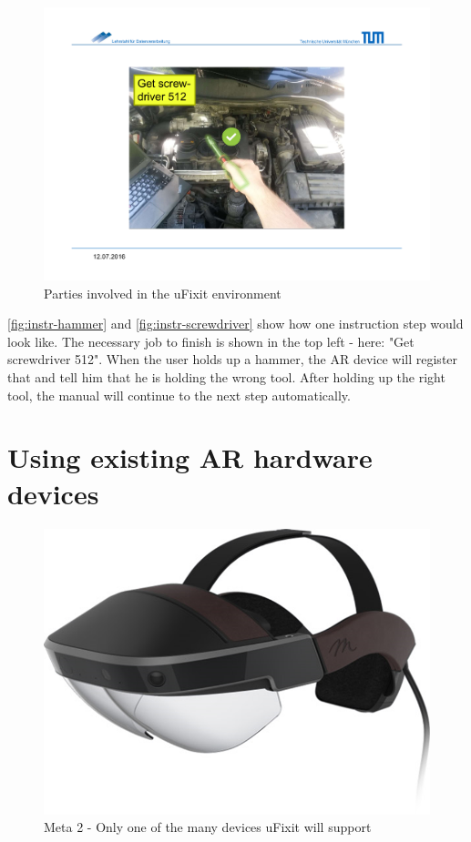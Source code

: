 		\begin{figure}[H]
			\includegraphics[width=\textwidth, trim=4cm 3cm 4cm 4cm, clip]{../images/instr-screwdriver.pdf}
			\centering
			\caption{Parties involved in the uFixit environment}
			\label{fig:instr-screwdriver}
		\end{figure}
		
		\autoref{fig:instr-hammer} and \autoref{fig:instr-screwdriver} show how one instruction step would look like. The necessary job to finish is shown in the top left - here: "Get screwdriver 512". When the user holds up a hammer, the AR device will register that and tell him that he is holding the wrong tool. After holding up the right tool, the manual will continue to the next step automatically.
		
	
	\section{Using existing AR hardware devices}
	
		
		\begin{figure}[H]
			\centering
			\includegraphics[width=0.5\linewidth]{../images/meta2.png}
			\caption{Meta 2 - Only one of the many devices uFixit will support}
			\label{fig:meta2}
		\end{figure}
		
